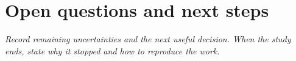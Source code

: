 \section{Open questions and next steps}
\label{sec:next}
\emph{Record remaining uncertainties and the next useful decision. When the
study ends, state why it stopped and how to reproduce the work.}
